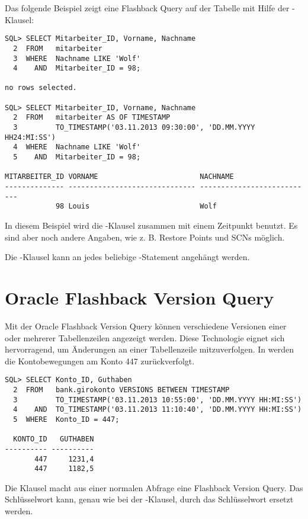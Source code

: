       Das folgende Beispiel zeigt eine Flashback Query auf der Tabelle  mit Hilfe der -Klausel:
      \begin{lstlisting}[caption={Flashback Query mit AS OF TIMESTAMP},label=admin1700,language=oracle_sql]
SQL> SELECT Mitarbeiter_ID, Vorname, Nachname
  2  FROM   mitarbeiter
  3  WHERE  Nachname LIKE 'Wolf'
  4    AND  Mitarbeiter_ID = 98;

no rows selected.

SQL> SELECT Mitarbeiter_ID, Vorname, Nachname
  2  FROM   mitarbeiter AS OF TIMESTAMP
  3         TO_TIMESTAMP('03.11.2013 09:30:00', 'DD.MM.YYYY HH24:MI:SS')
  4  WHERE  Nachname LIKE 'Wolf'
  5    AND  Mitarbeiter_ID = 98;

MITARBEITER_ID VORNAME                        NACHNAME
-------------- ------------------------------ ---------------------------
            98 Louis                          Wolf
      \end{lstlisting}
      In diesem Beispiel wird die -Klausel zusammen mit einem Zeitpunkt benutzt. Es sind aber noch andere Angaben, wie z. B. Restore Points und SCNs m\"oglich.
      \begin{merke}
        Die -Klausel kann an jedes beliebige -Statement angeh\"angt werden.
      \end{merke}
      \begin{literaturinternet}
        \item \cite{ADFNS01003}
      \end{literaturinternet}
    \section{Oracle Flashback Version Query}
      Mit der Oracle Flashback Version Query k\"onnen verschiedene Versionen einer oder mehrerer Tabellenzeilen angezeigt werden. Diese Technologie eignet sich hervorragend, um \"Anderungen an einer Tabellenzeile mitzuverfolgen. In  werden die Kontobewegungen am Konto 447 zur\"uckverfolgt.
      \begin{lstlisting}[caption={Verschiedene Versionen einer Zeile mit Flashback Version Query},label=admin1701,language=oracle_sql]
SQL> SELECT Konto_ID, Guthaben
  2  FROM   bank.girokonto VERSIONS BETWEEN TIMESTAMP
  3         TO_TIMESTAMP('03.11.2013 10:55:00', 'DD.MM.YYYY HH:MI:SS')
  4    AND  TO_TIMESTAMP('03.11.2013 11:10:40', 'DD.MM.YYYY HH:MI:SS')
  5  WHERE  Konto_ID = 447;

  KONTO_ID   GUTHABEN
---------- ----------
       447     1231,4
       447     1182,5
      \end{lstlisting}
      Die Klausel  macht aus einer normalen Abfrage eine Flashback Version Query. Das Schl\"usselwort  kann, genau wie bei der -Klausel, durch das Schl\"usselwort  ersetzt werden.

